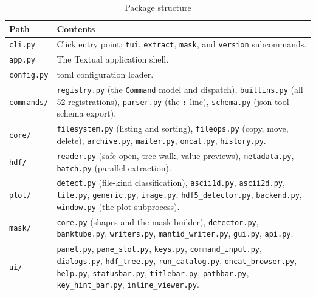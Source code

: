 \documentclass[tm]{ornltm}
\newcommand{\key}[1]{\textbf{\texttt{#1}}}
\begin{document}
\begin{table}[ht]
  \centering
  \caption{Package structure}
  \label{tab:layout}
  \small
  \begin{tabular}{l p{}}
    \toprule
    Path & Contents \\
    \midrule
    \texttt{cli.py} & Click entry point; \texttt{tui}, \texttt{extract},
      \texttt{mask}, and \texttt{version} subcommands. \\
    \texttt{app.py} & The Textual application shell. \\
    \texttt{config.py} & \Ac{toml} configuration loader. \\
    \texttt{commands/} & \texttt{registry.py} (the \texttt{Command} model and
      dispatch), \texttt{builtins.py} (all 52 registrations),
      \texttt{parser.py} (the \key{:} line), \texttt{schema.py} (\ac{json} tool
      schema export). \\
    \texttt{core/} & \texttt{filesystem.py} (listing and sorting),
      \texttt{fileops.py} (copy, move, delete), \texttt{archive.py},
      \texttt{mailer.py}, \texttt{oncat.py}, \texttt{history.py}. \\
    \texttt{hdf/} & \texttt{reader.py} (safe open, tree walk, value previews),
      \texttt{metadata.py}, \texttt{batch.py} (parallel extraction). \\
    \texttt{plot/} & \texttt{detect.py} (file-kind classification),
      \texttt{ascii1d.py}, \texttt{ascii2d.py}, \texttt{tile.py},
      \texttt{generic.py}, \texttt{image.py}, \texttt{hdf5\_detector.py},
      \texttt{backend.py}, \texttt{window.py} (the plot subprocess). \\
    \texttt{mask/} & \texttt{core.py} (shapes and the mask builder),
      \texttt{detector.py}, \texttt{banktube.py}, \texttt{writers.py},
      \texttt{mantid\_writer.py}, \texttt{gui.py}, \texttt{api.py}. \\
    \texttt{ui/} & \texttt{panel.py}, \texttt{pane\_slot.py},
      \texttt{keys.py}, \texttt{command\_input.py}, \texttt{dialogs.py},
      \texttt{hdf\_tree.py}, \texttt{run\_catalog.py},
      \texttt{oncat\_browser.py}, \texttt{help.py}, \texttt{statusbar.py},
      \texttt{titlebar.py}, \texttt{pathbar.py}, \texttt{key\_hint\_bar.py},
      \texttt{inline\_viewer.py}. \\
    \bottomrule
  \end{tabular}
\end{table}

\end{document}
